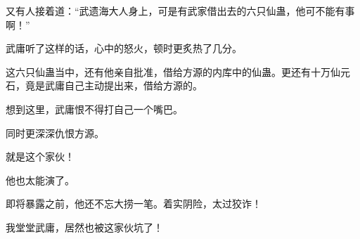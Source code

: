 \begin{this_body}
又有人接着道：“武遗海大人身上，可是有武家借出去的六只仙蛊，他可不能有事啊！”

武庸听了这样的话，心中的怒火，顿时更炙热了几分。

这六只仙蛊当中，还有他亲自批准，借给方源的内库中的仙蛊。更还有十万仙元石，竟是武庸自己主动提出来，借给方源的。

想到这里，武庸恨不得打自己一个嘴巴。

同时更深深仇恨方源。

就是这个家伙！

他也太能演了。

即将暴露之前，他还不忘大捞一笔。着实阴险，太过狡诈！

我堂堂武庸，居然也被这家伙坑了！

\end{this_body}

